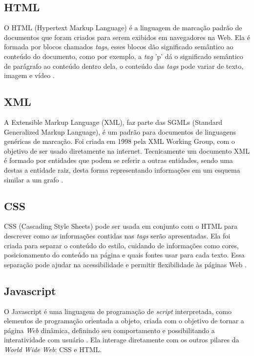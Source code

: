 \subsection{ HTML }
 O HTML (Hypertext Markup Language) é a linguagem de marcação padrão de documentos que foram criados para serem exibidos em navegadores na Web. Ela é formada por blocos chamados \textit{tags}, esses blocos dão significado semântico ao conteúdo do documento, como por exemplo, a \textit{tag} 'p' dá o significado semântico de parágrafo ao conteúdo dentro dela, o conteúdo das \textit{tags} pode variar de texto, imagem e vídeo \cite{musciano1996html}.
 
 \subsection{ XML }
 
 A Extensible Markup Language (XML), faz parte das SGMLs (Standard Generalized Markup Language), é um padrão para documentos de linguagens genéricas de marcação. Foi criada em 1998 pela XML Working Group, com o objetivo de ser usado diretamente na internet. Tecnicamente um documento XML é formado por entidades que podem se referir a outras entidades, sendo uma destas a entidade raiz, desta forma representando informações em um esquema similar a um grafo \cite{bray2000extensible}.
 
 \subsection{ CSS }

CSS  (Cascading Style Sheets) pode ser usada em conjunto com o HTML para descrever  como as informações contidas nas
\textit{tags} serão apresentadas. Ela foi criada para separar o conteúdo do estilo, cuidando de informações como
cores, posicionamento do conteúdo na página e quais
fontes usar para cada texto. Essa separação pode
ajudar na
acessibilidade e permitir flexibilidade às
páginas Web \cite{ahmadian2011desnutrin}.

 \subsection{ Javascript }

O Javascript é uma linguagem de programação de \textit{script} interpretada, como elementos de programação
orientada a objeto, criada com o objetivo de
tornar a página \textit{Web} dinâmica, definindo
seu comportamento e possibilitando a
interatividade com usuário
\cite{flanagan2006javascript}. Ela interage
diretamente com os outros pilares da
\textit{World Wide Web}: CSS e HTML.

